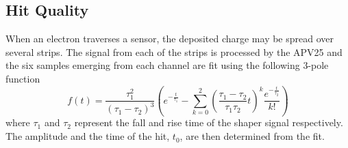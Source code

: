 \subsection{Hit Quality}

When an electron traverses a sensor, the deposited charge may be spread over
several strips.  The signal from each of the strips is processed by the
APV25 and the six samples emerging from each channel are fit using the 
following 3-pole function
\begin{equation}
    f(t) = \frac{\tau_1^2}{(\tau_1 - \tau_2)^3}\left( e^{-\frac{t}{\tau_1}}
            - \sum_{k=0}^2 \left(\frac{\tau_1 - \tau_2}{\tau_1\tau_2}t\right)^k
        \frac{e^{-\frac{t}{\tau_2}}}{k!} \right)
\end{equation}
where $\tau_1$ and $\tau_2$ represent the fall and rise time of the shaper 
signal respectively.  The amplitude and the time of the hit, $t_0$, are then
determined from the fit.


